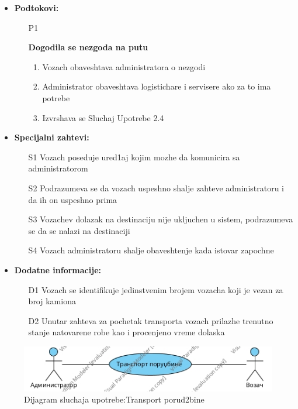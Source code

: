 \begin{itemize}
{\begin{itemize}
{	}
		\end{itemize}
					}

	\item{\textbf{Podtokovi:}
		\begin{itemize}
			\item[P{1}]{\textbf{Dogodila se nezgoda na putu }
				\begin{enumerate}
					\item{Vozach obaveshtava administratora o nezgodi}
					\item{Administrator obaveshtava logistichare i servisere ako za to ima potrebe}
					\item{Izvrshava se Sluchaj Upotrebe 2.4}
				\end{enumerate}
							}
		\end{itemize}
			}
	\item{\textbf{Specijalni zahtevi:} \begin{itemize}
			\item[S{1}]{Vozach poseduje ured1aj kojim mozhe da komunicira sa administratorom}
			\item[S{2}]{Podrazumeva se da vozach uspeshno shalje zahteve administratoru i da ih on uspeshno prima}
			\item[S{3}]{Vozachev dolazak na destinaciju nije ukljuchen u sistem, podrazumeva se da se nalazi na destinaciji}
			\item[S{4}]{Vozach administratoru shalje obaveshtenje kada istovar zapochne}
		\end{itemize}}
	\item{\textbf{Dodatne informacije:}
			\begin{itemize}
				\item[D{1}]{Vozach se identifikuje jedinstvenim brojem vozacha koji je vezan za broj kamiona}
				\item[D{2}]{Unutar zahteva za pochetak transporta vozach prilazhe trenutno stanje natovarene robe kao i procenjeno vreme dolaska}
			\end{itemize}
		}
\end{itemize}
\begin{figure}[H]
	\includegraphics[scale=0.5]{Slike/UML/SUdostavljanjePorudzbineUseCase}
	\centering
	\caption{Dijagram sluchaja upotrebe:Transport porud2bine}
	\label{ucDostavljanje}
\end{figure}
